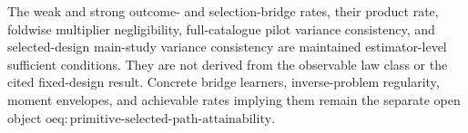 The weak and strong outcome- and selection-bridge rates, their product rate, foldwise multiplier negligibility, full-catalogue pilot variance consistency, and selected-design main-study variance consistency are maintained estimator-level sufficient conditions.  They are not derived from the observable law class or the cited fixed-design result.  Concrete bridge learners, inverse-problem regularity, moment envelopes, and achievable rates implying them remain the separate open object \(\mathrm{oeq{:}primitive\text{-}selected\text{-}path\text{-}attainability}\).